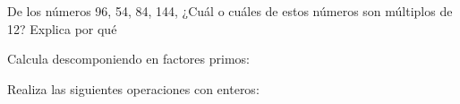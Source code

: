 \documentclass[addpoints,spanish, 12pt,a4paper]{exam}
\begin{document}
\begin{questions}



    \question[1] De los números 96, 54, 84, 144, ¿Cuál o cuáles de estos números son múltiplos de 12? Explica por qué \vspace{80pt}
\newpage


    \question[1] Calcula descomponiendo en factores primos:
    \begin{multicols}{2}
    
    \end{multicols}

\question[2] Realiza las siguientes operaciones con enteros:
\begin{multicols}{2}
\begin{parts}

\end{parts}
\end{multicols}
\end{questions}
\end{document}

